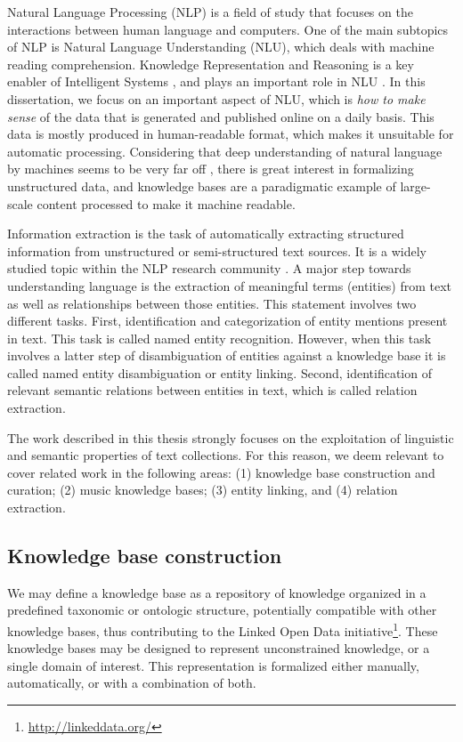 Natural Language Processing (NLP) is a field of study that focuses on the interactions between human language and computers. One of the main subtopics of NLP is Natural Language Understanding (NLU), which deals with machine reading comprehension.
Knowledge Representation and Reasoning is a key enabler of Intelligent Systems \citep{Suchaneketal2007}, and plays an important role in NLU \citep{BaralandDeGiacomo2015}.
In this dissertation, we focus on an important aspect of NLU, which is \textit{how to make sense} of the data that is generated and published online on a daily basis. This data is mostly produced in human-readable format, which makes it unsuitable for automatic processing. Considering that deep understanding of natural language by machines seems to be very far off \citep{CambriaandWhite2014}, there is great interest in formalizing unstructured data, and knowledge bases are a paradigmatic example of large-scale content processed to make it machine readable.

Information extraction is the task of automatically extracting structured information from unstructured or semi-structured text sources. It is a widely studied topic within the NLP research community \citep{cowie1996information}.
A major step towards understanding language is the extraction of meaningful terms (entities) from text as well as relationships between those entities. This statement involves two different tasks. First, identification and categorization of entity mentions present in text. This task is called named entity recognition. However, when this task involves a latter step of disambiguation of entities against a knowledge base it is called named entity disambiguation or entity linking. Second, identification of relevant semantic relations between entities in text, which is called relation extraction.

The work described in this thesis strongly focuses on the exploitation of linguistic and semantic properties of text collections. For this reason, we deem relevant to cover related work in the following areas: (1) knowledge base construction and curation; (2) music knowledge bases; (3) entity linking, and (4) relation extraction.


\subsection{Knowledge base construction}
\label{sec:SOA:nlu:kbs}

We may define a knowledge base as a repository of knowledge organized in a predefined taxonomic or ontologic structure, potentially compatible with other knowledge bases, thus contributing to the Linked Open Data initiative\footnote{\url{http://linkeddata.org/}}. These knowledge bases may be designed to represent unconstrained knowledge, or a single domain of interest. This representation is formalized either manually, automatically, or with a combination of both.

